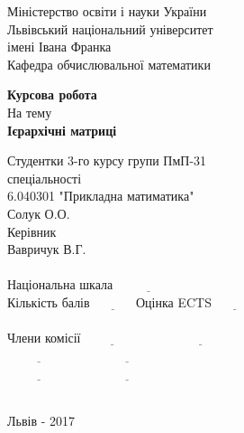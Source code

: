\documentclass[12pt]{report}
\begin{document}
\begin{titlepage}
\begin{center}
{\Large Міністерство освіти і науки України\\}
\large  {Львівський національний університет\\імені Івана Франка\\ Кафедра обчислювальної математики}\\
\end{center}
\vspace*{3cm}
\begin{center}

\Large{\textbf{Курсова робота}}\\
\large{На тему}\\
\Large{\textbf{Ієрархічні матриці}}
\end{center}
\normalsize
\vspace*{4cm}\hspace*{8cm}Студентки 3-го курсу групи ПмП-31 \\
\hspace*{8cm}спеціальності \\
\hspace*{8cm}6.040301 "Прикладна матиматика"\\
\hspace*{8cm}Солук О.О.\\

\hspace*{7.1cm}Керівник\\
\hspace*{8cm}Вавричук В.Г.\\
 \\
\hspace*{8cm}\small{Національна шкала} $\underline{ \quad \quad \quad \quad \quad}$\\
\hspace*{8cm}\small{Кількість балів} $\underline{ \quad \quad\quad}$ \small{Оцінка ECTS} $\underline{ \quad \quad \quad}$\\
 \\
\hspace*{4.4cm}\normalsize{Члени комісії}\hspace*{1cm}$\underline{ \quad \quad \quad \quad \quad}$\hspace*{0.5cm}$\underline{ \quad \quad \quad \quad \quad\quad \quad\quad \quad}$\\
\hspace*{8cm}$\underline{ \quad \quad \quad \quad \quad}$\hspace*{0.5cm}$\underline{ \quad \quad \quad \quad \quad\quad \quad\quad \quad}$\\
\hspace*{8cm}$\underline{ \quad \quad \quad \quad \quad}$\hspace*{0.5cm}$\underline{ \quad \quad \quad \quad \quad\quad \quad\quad \quad}$\\
\vspace*{2.5cm}\\
\begin{center}
Львів - 2017
\end{center}
\end{titlepage}
\end{document}
